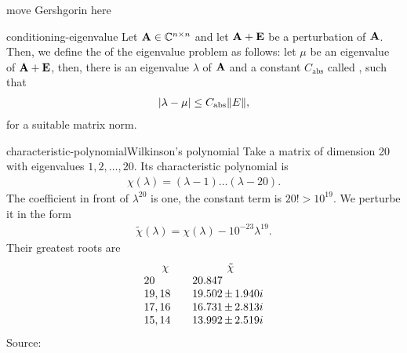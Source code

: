 \begin{todo}
  move Gershgorin here
\end{todo}

\begin{Definition}{conditioning-eigenvalue}
  Let $\mathbf A\in\mathbb C^{n\times n}$ and let $\mathbf A+\mathbf E$ be a perturbation of $\mathbf A$. Then, we define the  of the eigenvalue problem as follows: let $\mu$ be an eigenvalue of $\mathbf A+\mathbf E$, then, there is an eigenvalue $\lambda$ of $\mathbf A$ and a constant $C_{\text{abs}}$ called , such that
  \begin{gather*}
    \lvert\lambda-\mu\rvert \le C_{\text{abs}} \lVert E\rVert,
  \end{gather*}
  for a suitable matrix norm.
\end{Definition}

\begin{Example*}{characteristic-polynomial}{Wilkinson's polynomial}
  Take a matrix of dimension 20 with eigenvalues $1,2,\ldots,20$. Its
  characteristic polynomial is
  \begin{gather}
    \chi(\lambda) = (\lambda-1)\dots(\lambda-20).
  \end{gather}
  The coefficient in front of $\lambda^{20}$ is one, the constant term is $20! > 10^{19}$.
  We perturbe it in the form
  \begin{gather}
    \tilde \chi(\lambda) = \chi(\lambda) - 10^{-23}\lambda^{19}.
  \end{gather}
  Their greatest roots are
  \begin{gather}
    \begin{array}{l@{\qquad}l@{\,}c@{\,}l}
      \multicolumn{1}{c}{\chi}&
      \multicolumn{3}{c}{\tilde \chi}\\
      20&20.847\\
      19,18&19.502&\pm&1.940i\\
      17,16&16.731&\pm&2.813i\\
      15,14&13.992&\pm&2.519i\\
    \end{array}
  \end{gather}
  {\tiny Source: \cite{DeuflhardHohmann08}}
\end{Example*}

